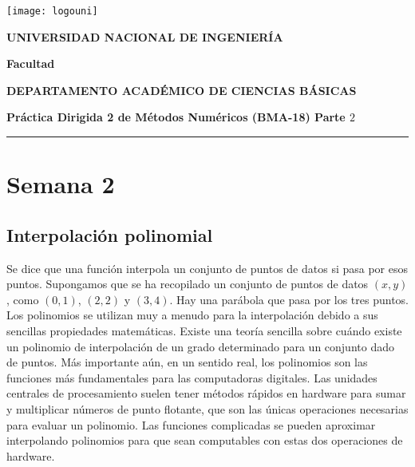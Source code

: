 


\providecommand{\faculty}{Facultad}
\noindent\parbox[c]{.18\textwidth}{\texttt{[image: logouni]}}\hfill
\parbox[c]{1\textwidth}{\raggedright%
    {\large\textbf{UNIVERSIDAD NACIONAL DE INGENIERÍA} \par\smallskip}
    {\large\textbf{\faculty} \par\smallskip}
    {\large\textbf{DEPARTAMENTO ACADÉMICO DE CIENCIAS BÁSICAS} \par\smallskip}
}

\begin{center}\bfseries\large
    Práctica Dirigida 2 de Métodos Numéricos (BMA-18)
    Parte $2$
\end{center}

\vspace{-0.5cm}

\hrulefill
\vspace{-2.5mm}

\rule{16.5cm}{0.8mm}

\section{Semana 2}
\subsection{Interpolación polinomial}

Se dice que una función interpola un conjunto de puntos de datos
si pasa por esos puntos.
Supongamos que se ha recopilado un conjunto de puntos de datos
$\left(x,y\right)$, como $\left(0,1\right)$, $\left(2,2\right)$ y
$\left(3,4\right)$.
Hay una parábola que pasa por los tres puntos.
Los polinomios se utilizan muy a menudo para la interpolación
debido a sus sencillas propiedades matemáticas.
Existe una teoría sencilla sobre cuándo existe un polinomio de
interpolación de un grado determinado para un conjunto dado de
puntos.
Más importante aún, en un sentido real, los polinomios son las
funciones más fundamentales para las computadoras digitales.
Las unidades centrales de procesamiento suelen tener métodos
rápidos en hardware para sumar y multiplicar números de punto
flotante, que son las únicas operaciones necesarias para evaluar
un polinomio.
Las funciones complicadas se pueden aproximar interpolando
polinomios para que sean computables con estas dos operaciones de
hardware.

